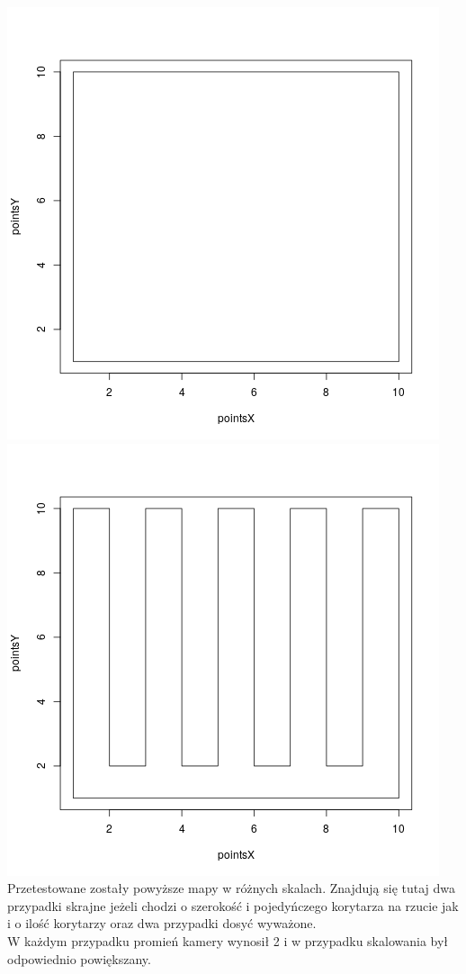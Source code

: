 \documentclass[12pt,a4paper]{article}
\begin{document}
\includegraphics[scale=0.4]{openSpace.png}
\includegraphics[scale=0.4]{slimLines.png} \\
Przetestowane zostały powyższe mapy w różnych skalach. Znajdują się tutaj dwa przypadki skrajne jeżeli chodzi o szerokość i pojedyńczego korytarza na rzucie jak i o ilość korytarzy oraz dwa przypadki dosyć wyważone. \\
W każdym przypadku promień kamery wynosił 2 i w przypadku skalowania był odpowiednio powiększany.
\end{document}
